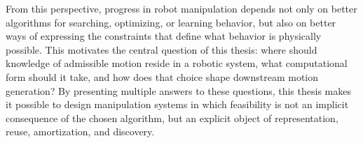 From this perspective, progress in robot manipulation depends not only on better algorithms for searching, optimizing, or learning behavior, but also on better ways of expressing the constraints that define what behavior is physically possible.
This motivates the central question of this thesis: where should knowledge of admissible motion reside in a robotic system, what computational form should it take, and how does that choice shape downstream motion generation?
By presenting multiple answers to these questions, this thesis makes it possible to design manipulation systems in which feasibility is not an implicit consequence of the chosen algorithm, but an explicit object of representation, reuse, amortization, and discovery.



